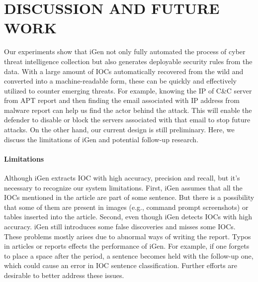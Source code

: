 \chapter{DISCUSSION AND FUTURE WORK}
Our experiments show that iGen not only fully automated the process of cyber threat intelligence collection but also generates deployable security rules from the data. With a large amount of IOCs automatically recovered from the wild and converted into a machine-readable form, these can be quickly and effectively utilized to counter emerging threats. For example, knowing the IP of C\&C server from APT report and then finding the email associated with IP address from malware report can help us find the actor behind the attack. This will enable the defender to disable or block the servers associated with that email to stop future attacks. On the other hand, our current design is still preliminary. Here, we discuss the limitations of iGen and potential follow-up research.

\subsubsection{Limitations}
Although iGen extracts IOC with high accuracy, precision and recall, but it's necessary to recognize our system limitations. First, iGen assumes that all the IOCs mentioned in the article are part of some sentence. But there is a possibility that some of them are present in images (e.g., command prompt screenshots) or tables inserted into the article. Second, even though iGen detects IOCs with high accuracy. iGen still introduces some false discoveries and misses some IOCs. These problems mostly arises due to abnormal ways of writing the report. Typos in articles or reports effects the performance of iGen. For example, if one forgets to place a space after the period, a sentence becomes held with the follow-up one, which could cause an error in IOC sentence classification. Further efforts are desirable to better address these issues.